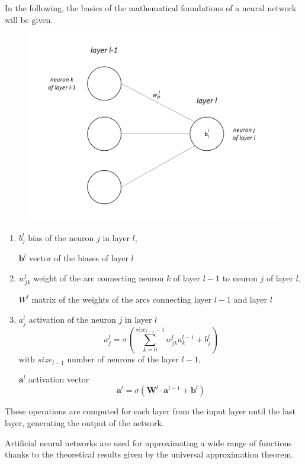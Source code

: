 \documentclass{Configuration_Files/PoliMi3i_thesis}
\begin{document}
In the following, the basics of the mathematical foundations of a neural network will be given.
\begin{figure}[H]
    \centering
    \includegraphics[scale=.3]{Images/layers_ann.png}
\end{figure}

\begin{enumerate}
    \item $b_{j}^{l}$ bias of the neuron $j$ in layer $l$,
    
    $\mathbf{b}^{l}$ vector of the biases of layer $l$
    \item $w^{l}_{jk}$ weight of the arc connecting neuron $k$ of layer $l-1$ to neuron $j$ of layer $l$,
    
    $W^{l}$ matrix of the weights of the arcs connecting layer $l-1$ and layer $l$
    \item $a_{j}^{l}$ activation of the neuron $j$ in layer $l$
    $$a_{j}^{l} = \sigma(\sum\limits_{k=0}^{size_{l-1}-1}{w_{jk}^{l} a_{k}^{l-1} + b_{j}^{l}})$$
    with $size_{l-1}$ number of neurons of the layer $l-1$,
    
    $\mathbf{a}^{l}$ activation vector
    $$\mathbf{a}^{l}=\sigma(\mathbf{W}^{l} \cdot \mathbf{a}^{l-1} + \mathbf{b}^{l})$$
\end{enumerate}

These operations are computed for each layer from the input layer until the last layer, generating the output of the network.

Artificial neural networks are used for approximating a wide range of functions thanks to the theoretical results given by the universal approximation theorem.
\end{document}
